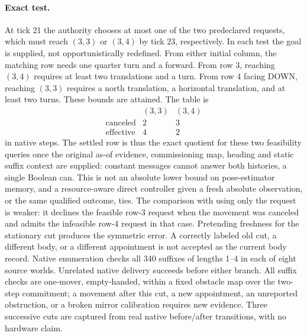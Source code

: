 \documentclass{article}
\begin{document}
\paragraph{Exact test.}
At tick 21 the authority chooses at most one of the two predeclared requests,
which must reach $(3,3)$ or $(3,4)$ by tick 23, respectively. In each test the
goal is supplied, not opportunistically redefined. From either initial column,
the matching row needs one quarter turn and a forward. From row 3, reaching
$(3,4)$ requires at least two translations and a turn. From row 4 facing DOWN,
reaching $(3,3)$ requires a north translation, a horizontal translation, and at
least two turns. These bounds are attained. The table is
\[
\begin{array}{c|cc}
 & (3,3)&(3,4)\\\hline
\mathrm{canceled}&2&3\\
\mathrm{effective}&4&2
\end{array}
\]
in native steps. The settled row is thus the exact quotient for these two
feasibility queries once the original as-of evidence, commissioning map,
heading and static suffix context are supplied: constant messages cannot
answer both histories, a single Boolean can. This is not an absolute lower bound
on pose-estimator memory, and a resource-aware direct controller given a fresh
absolute observation, or the same qualified outcome, ties. The comparison with
using only the request is weaker: it declines the feasible row-3 request when
the movement was canceled and admits the infeasible row-4 request in that case.
Pretending freshness for the stationary cut produces the symmetric error.
A correctly labeled old cut, a different body, or a different appointment is
not accepted as the current body record. Native enumeration checks all 340
suffixes of lengths 1--4 in each of eight source worlds. Unrelated native
delivery succeeds before either branch. All suffix checks are one-mover,
empty-handed, within a fixed obstacle map over the two-step commitment;
a movement after this cut, a new appointment, an unreported obstruction, or
a broken mirror calibration requires new evidence. Three successive cuts
are captured from real native before/after transitions, with no hardware claim.
\end{document}
